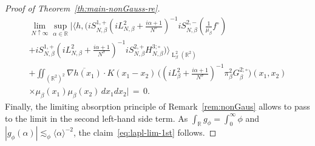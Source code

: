 \documentclass[a4paper,11pt,reqno,noindent]{amsart}
\theoremstyle{plain}
\numberwithin{equation}{section}
\newcommand{\R}{\mathbb R}
\newcommand{\3}{|\!|\!|}
\newcommand{\Ld}{\operatorname{L}}
\begin{document}
\begin{proof}[Proof of Theorem~\ref{th:main-nonGauss-re}]
\begin{multline*}
\lim_{N\uparrow\infty}\sup_{\alpha\in\R}\bigg|\Big\langle h,\Big(iS_{N,\beta}^{1,+}(iL_{N,\beta}^2+\tfrac{i\alpha+1}{N^\sigma})^{-1}iS_{N,\beta}^{2,-}(\tfrac1{\mu_\beta}f^\circ)\\
+iS_{N,\beta}^{1,+}(iL_{N,\beta}^2+\tfrac{i\alpha+1}{N^\sigma})^{-1}iS_{N,\beta}^{2,+}H_{N,\beta}^{3;\circ}\Big)\Big\rangle_{\Ld^2_\beta(\R^2)}\\
+\iint_{(\R^2)^2}\overline{\nabla h(x_1)}\cdot K(x_1-x_2)\,\big((iL_{\beta}^2+\tfrac{i\alpha+1}{N^\sigma})^{-1}\pi_\beta^2 G_{\beta}^{2;\circ}\big)(x_1,x_2)\\
\times\mu_\beta(x_1)\mu_\beta(x_2)\, dx_1dx_2\bigg|
\,=\,0.
\end{multline*}
{Finally, the limiting absorption principle of Remark~\ref{rem:nonGaus} allows to pass to the limit in the second left-hand side term. As $\int_\R g_\phi=\int_0^\infty \phi$ and $|g_\phi(\alpha)|\lesssim_\phi\langle\alpha\rangle^{-2}$, the claim~\eqref{eq:lapl-lim-1st} follows.}



\end{proof}
\end{document}
